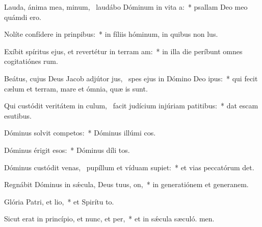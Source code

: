 \item Lauda, ánima mea, minum,~\pscross{} laudábo Dóminum in vita a:~* psallam Deo meo quámdi ero.
\item Nolíte confídere in prinpibus:~* in fíliis hóminum, in quibus non  lus.
\item Exíbit spíritus ejus, et revertétur in terram am:~* in illa die períbunt omnes cogitatiónes rum.
\item Beátus, cujus Deus Jacob adjútor jus,~\pscross{} spes ejus in Dómino Deo ipus:~* qui fecit cælum et terram, mare et ómnia, quæ  is sunt.
\item Qui custódit veritátem in culum,~\pscross{} facit judícium injúriam patitibus:~* dat escam esutibus.
\item Dóminus solvit competos:~* Dóminus illúmi cos.
\item Dóminus érigit esos:~* Dóminus díli tos.
\item Dóminus custódit venas,~\pscross{} pupíllum et víduam supiet:~* et vias peccatórum det.
\item Regnábit Dóminus in sǽcula, Deus tuus, on,~* in generatiónem et generanem.
\item Glória Patri, et lio,~* et Spirítu to.
\item Sicut erat in princípio, et nunc, et per,~* et in sǽcula sæculó. men.

